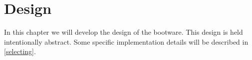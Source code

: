 \chapter{Design}
\label{design}

In this chapter we will develop the design of the bootware.
This design is held intentionally abstract.
Some specific implementation details will be described in \autoref{selecting}.













